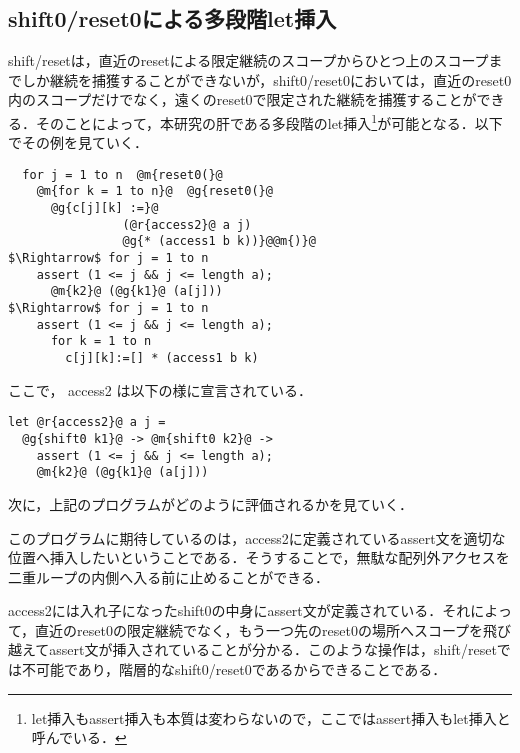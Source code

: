 \documentclass[10pt,a4j,xcolor=dvipsnames,twocolumn]{jarticle}
\theoremstyle{definition}
\begin{document}
\subsection{shift0/reset0による多段階let挿入}
shift/resetは，直近のresetによる限定継続のスコープからひとつ上のスコープまでしか継続を捕獲することができないが，shift0/reset0においては，直近のreset0内のスコープだけでなく，遠くのreset0で限定された継続を捕獲することができる．そのことによって，本研究の肝である多段階のlet挿入\footnote{let挿入もassert挿入も本質は変わらないので，ここではassert挿入もlet挿入と呼んでいる．}が可能となる．以下でその例を見ていく．

\begin{lstlisting}
  for j = 1 to n  @m{reset0(}@
    @m{for k = 1 to n}@  @g{reset0(}@
      @g{c[j][k] :=}@
                (@r{access2}@ a j)
                @g{* (access1 b k))}@@m{)}@
$\Rightarrow$ for j = 1 to n
    assert (1 <= j && j <= length a);
      @m{k2}@ (@g{k1}@ (a[j]))
$\Rightarrow$ for j = 1 to n
    assert (1 <= j && j <= length a);
      for k = 1 to n
        c[j][k]:=[] * (access1 b k)
\end{lstlisting}

ここで， access2 は以下の様に宣言されている．
\begin{lstlisting}
let @r{access2}@ a j =
  @g{shift0 k1}@ -> @m{shift0 k2}@ ->
    assert (1 <= j && j <= length a);
    @m{k2}@ (@g{k1}@ (a[j]))
\end{lstlisting}


次に，上記のプログラムがどのように評価されるかを見ていく．

このプログラムに期待しているのは，access2に定義されているassert文を適切な位置へ挿入したいということである．そうすることで，無駄な配列外アクセスを二重ループの内側へ入る前に止めることができる．

access2には入れ子になったshift0の中身にassert文が定義されている．それによって，直近のreset0の限定継続でなく，もう一つ先のreset0の場所へスコープを飛び越えてassert文が挿入されていることが分かる．このような操作は，shift/resetでは不可能であり，階層的なshift0/reset0であるからできることである．



\end{document}
